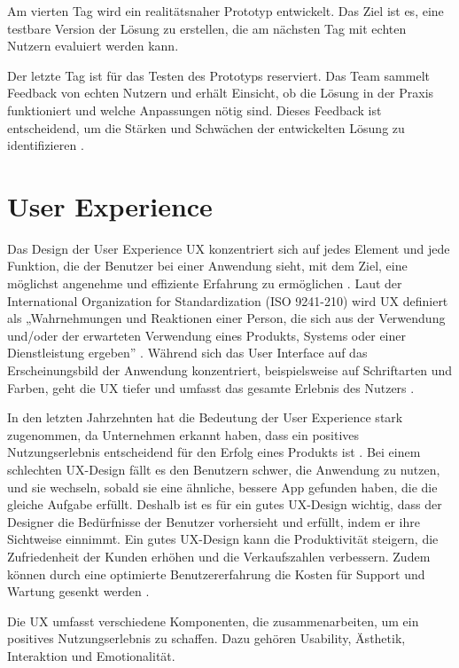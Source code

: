 Am vierten Tag wird ein realitätsnaher Prototyp entwickelt. Das Ziel ist es, eine testbare Version der Lösung zu erstellen, die am nächsten Tag mit echten Nutzern evaluiert werden kann. 

Der letzte Tag ist für das Testen des Prototyps reserviert. Das Team sammelt Feedback von echten Nutzern und erhält Einsicht, ob die Lösung in der Praxis funktioniert und welche Anpassungen nötig sind. Dieses Feedback ist entscheidend, um die Stärken und Schwächen der entwickelten Lösung zu identifizieren \cite[S.22 ff.]{Design_Sprint}.

\section{User Experience}
Das Design der User Experience \ac{UX} konzentriert sich auf jedes Element und jede Funktion, die der Benutzer bei einer Anwendung sieht, mit dem Ziel, eine möglichst angenehme und effiziente Erfahrung zu ermöglichen \cite[S.12]{Bordegoni}. 
Laut der International Organization for Standardization (ISO 9241-210) wird UX definiert als „Wahrnehmungen und Reaktionen einer Person, die sich aus der Verwendung und/oder der erwarteten Verwendung eines Produkts, Systems oder einer Dienstleistung ergeben” \cite{iso}. 
Während sich das User Interface auf das Erscheinungsbild der Anwendung konzentriert, beispielsweise auf Schriftarten und Farben, geht die UX tiefer und umfasst das gesamte Erlebnis des Nutzers \cite[S.8]{Canziba}.

In den letzten Jahrzehnten hat die Bedeutung der User Experience stark zugenommen, da Unternehmen erkannt haben, dass ein positives Nutzungserlebnis entscheidend für den Erfolg eines Produkts ist \cite{ux_article}. 
Bei einem schlechten UX-Design fällt es den Benutzern schwer, die Anwendung zu nutzen, und sie wechseln, sobald sie eine ähnliche, bessere App gefunden haben, die die gleiche Aufgabe erfüllt. 
Deshalb ist es für ein gutes UX-Design wichtig, dass der Designer die Bedürfnisse der Benutzer vorhersieht und erfüllt, indem er ihre Sichtweise einnimmt. Ein gutes UX-Design kann die Produktivität steigern, die Zufriedenheit der Kunden erhöhen und die Verkaufszahlen verbessern. 
Zudem können durch eine optimierte Benutzererfahrung die Kosten für Support und Wartung gesenkt werden \cite[S.8 ff.]{Canziba}.

Die UX umfasst verschiedene Komponenten, die zusammenarbeiten, um ein positives Nutzungserlebnis zu schaffen. Dazu gehören Usability, Ästhetik, Interaktion und Emotionalität.

